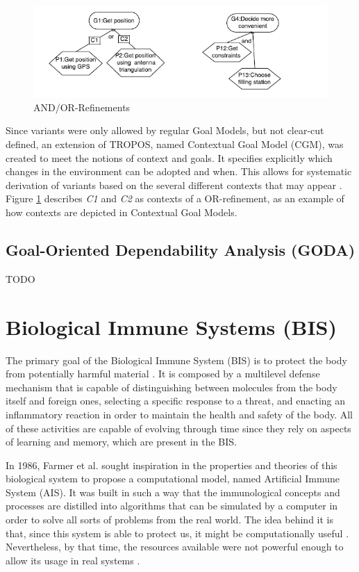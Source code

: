 \begin{figure}[!htb]
 \centering
 \includegraphics[width=\linewidth]{img/and-or-fill.png}
 \caption{AND/OR-Refinements}
\label{fig:andorref}
\end{figure}  


Since variants were only allowed by regular Goal Models, but not clear-cut defined, an extension of TROPOS, named Contextual Goal Model (CGM), was created to meet the notions of context and goals. It specifies explicitly which changes in the environment can be adopted and when. This allows for systematic derivation of variants based on the  several different contexts that may appear \cite{ali_goal_based_2010}. Figure \ref{fig:andorref} describes \textit{C1} and \textit{C2} as contexts of a OR-refinement, as an example of how contexts are depicted in Contextual Goal Models.

\subsection{Goal-Oriented Dependability Analysis (GODA)}
TODO


\section{Biological Immune Systems (BIS)} \label{sec:bgais}

The primary goal of the Biological Immune System (BIS) is to protect the body from potentially harmful material \cite{AISSOA2015}. It is composed by a multilevel defense mechanism that is capable of distinguishing between molecules from the body itself and foreign ones, selecting a specific response to a threat, and enacting an inflammatory reaction in order to maintain the health and safety of the body. All of these activities are capable of evolving through time since they rely on aspects of learning and memory, which are present in the BIS.

In 1986, Farmer et al. \cite{ImmuneSysAdapML1986} sought inspiration in the properties and theories of this biological system to propose a computational model, named Artificial Immune System (AIS). It was built in such a way that the immunological concepts and processes are distilled into algorithms that can be simulated by a computer in order to solve all sorts of problems from the real world. The idea behind it is that, since this system is able to protect us, it might be computationally useful \cite{EvaluateAIS2005}. Nevertheless, by that time, the resources available were not powerful enough to allow its usage in real systems \cite{AdaptiveImmunitySAS2021}.

